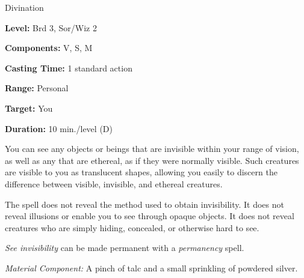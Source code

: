 
Divination

\textbf{Level:} Brd 3, Sor/Wiz 2

\textbf{Components:} V, S, M

\textbf{Casting Time:} 1 standard action

\textbf{Range:} Personal

\textbf{Target:} You

\textbf{Duration:} 10 min./level (D)

You can see any objects or beings that are invisible within your range of vision, 
as well as any that are ethereal, as if they were normally visible. Such creatures 
are visible to you as translucent shapes, allowing you easily to discern the difference 
between visible, invisible, and ethereal creatures.

The spell does not reveal the method used to obtain invisibility. It does not reveal 
illusions or enable you to see through opaque objects. It does not reveal creatures 
who are simply hiding, concealed, or otherwise hard to see.

\textit{See invisibility} can be made permanent with a \textit{permanency} spell.

\textit{Material Component:} A pinch of talc and a small sprinkling of powdered 
silver.

